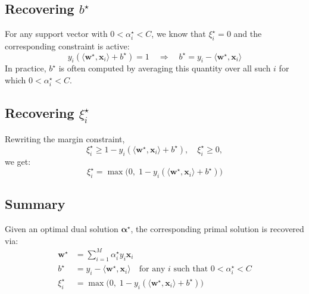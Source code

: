 \subsection*{Recovering $b^\star$}

For any support vector with $0 < \alpha_i^\star < C$, we know that $\xi_i^\star = 0$ and the corresponding constraint is active:
\[
y_i(\langle \symbf{w}^\star, \symbf{x}_i \rangle + b^\star) = 1 
\quad \Rightarrow \quad 
\boxed{b^\star = y_i - \langle \symbf{w}^\star, \symbf{x}_i \rangle}
\]
In practice, $b^\star$ is often computed by averaging this quantity over all such $i$ for which $0 < \alpha_i^\star < C$.

\subsection*{Recovering $\xi_i^\star$}

Rewriting the margin constraint,
\[
\xi_i^\star \ge 1 - y_i(\langle \symbf{w}^\star, \symbf{x}_i \rangle + b^\star), \quad \xi_i^\star \ge 0,
\]
we get:
\[
\boxed{\xi_i^\star = \max\big(0,\; 1 - y_i(\langle \symbf{w}^\star, \symbf{x}_i \rangle + b^\star)\big)}
\]

\subsection*{Summary}

Given an optimal dual solution $\symbf{\alpha}^\star$, the corresponding primal solution is recovered via:
\[
\boxed{
\begin{aligned}
\symbf{w}^\star &= \sum_{i=1}^M \alpha_i^\star y_i \symbf{x}_i \\
b^\star &= y_i - \langle \symbf{w}^\star, \symbf{x}_i \rangle \quad \text{for any } i \text{ such that } 0 < \alpha_i^\star < C \\
\xi_i^\star &= \max\big(0,\; 1 - y_i(\langle \symbf{w}^\star, \symbf{x}_i \rangle + b^\star)\big)
\end{aligned}
}
\]

